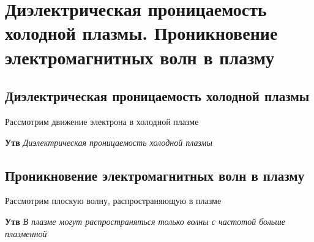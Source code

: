 \documentclass[a4paper, 14pt]{article}
\begin{document}
    \section{Диэлектрическая проницаемость холодной плазмы.
    Проникновение электромагнитных волн в плазму}
    
    \subsection{Диэлектрическая проницаемость холодной плазмы}
    
    Рассмотрим движение электрона в холодной плазме
    
    \textbf{Утв} \textit{Диэлектрическая проницаемость холодной плазмы}
    
    \subsection{Проникновение электромагнитных волн в плазму}
    
    Рассмотрим плоскую волну, распространяющую в плазме
    
    \textbf{Утв} \textit{В плазме могут распространяться только волны с частотой больше плазменной}
\end{document}
